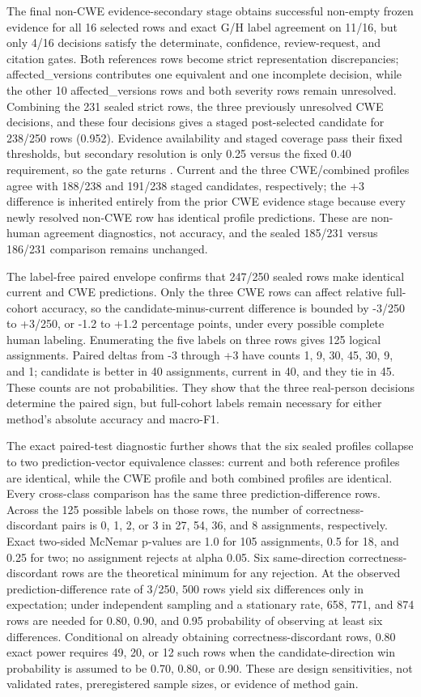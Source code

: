 The final non-CWE evidence-secondary stage obtains successful non-empty frozen evidence for all 16 selected rows and exact G/H label agreement on 11/16, but only 4/16 decisions satisfy the determinate, confidence, review-request, and citation gates. Both references rows become strict representation discrepancies; affected\_versions contributes one equivalent and one incomplete decision, while the other 10 affected\_versions rows and both severity rows remain unresolved. Combining the 231 sealed strict rows, the three previously unresolved CWE decisions, and these four decisions gives a staged post-selected candidate for 238/250 rows (0.952). Evidence availability and staged coverage pass their fixed thresholds, but secondary resolution is only 0.25 versus the fixed 0.40 requirement, so the gate returns . Current and the three CWE/combined profiles agree with 188/238 and 191/238 staged candidates, respectively; the +3 difference is inherited entirely from the prior CWE evidence stage because every newly resolved non-CWE row has identical profile predictions. These are non-human agreement diagnostics, not accuracy, and the sealed 185/231 versus 186/231 comparison remains unchanged.

The label-free paired envelope confirms that 247/250 sealed rows make identical current and CWE predictions. Only the three CWE rows can affect relative full-cohort accuracy, so the candidate-minus-current difference is bounded by -3/250 to +3/250, or -1.2 to +1.2 percentage points, under every possible complete human labeling. Enumerating the five labels on three rows gives 125 logical assignments. Paired deltas from -3 through +3 have counts 1, 9, 30, 45, 30, 9, and 1; candidate is better in 40 assignments, current in 40, and they tie in 45. These counts are not probabilities. They show that the three real-person decisions determine the paired sign, but full-cohort labels remain necessary for either method's absolute accuracy and macro-F1.

The exact paired-test diagnostic further shows that the six sealed profiles collapse to two prediction-vector equivalence classes: current and both reference profiles are identical, while the CWE profile and both combined profiles are identical. Every cross-class comparison has the same three prediction-difference rows. Across the 125 possible labels on those rows, the number of correctness-discordant pairs is 0, 1, 2, or 3 in 27, 54, 36, and 8 assignments, respectively. Exact two-sided McNemar p-values are 1.0 for 105 assignments, 0.5 for 18, and 0.25 for two; no assignment rejects at alpha 0.05. Six same-direction correctness-discordant rows are the theoretical minimum for any rejection. At the observed prediction-difference rate of 3/250, 500 rows yield six differences only in expectation; under independent sampling and a stationary rate, 658, 771, and 874 rows are needed for 0.80, 0.90, and 0.95 probability of observing at least six differences. Conditional on already obtaining correctness-discordant rows, 0.80 exact power requires 49, 20, or 12 such rows when the candidate-direction win probability is assumed to be 0.70, 0.80, or 0.90. These are design sensitivities, not validated rates, preregistered sample sizes, or evidence of method gain.

